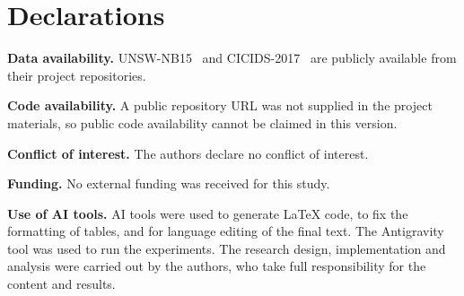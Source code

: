 \documentclass[iicol,Numbered]{sn-jnl}
\begin{document}
\section*{Declarations}

\textbf{Data availability.} UNSW-NB15~\cite{moustafa2015unsw} and
CICIDS-2017~\cite{sharafaldin2018cicids} are publicly available from their
project repositories.

\textbf{Code availability.} A public repository URL was not supplied in the
project materials, so public code availability cannot be claimed in this
version.

\textbf{Conflict of interest.} The authors declare no conflict of interest.

\textbf{Funding.} No external funding was received for this study.

\textbf{Use of AI tools.} AI tools were used to generate LaTeX code, to fix the
formatting of tables, and for language editing of the final text. The Antigravity
tool was used to run the experiments. The research design, implementation and
analysis were carried out by the authors, who take full responsibility for the
content and results.
\end{document}
